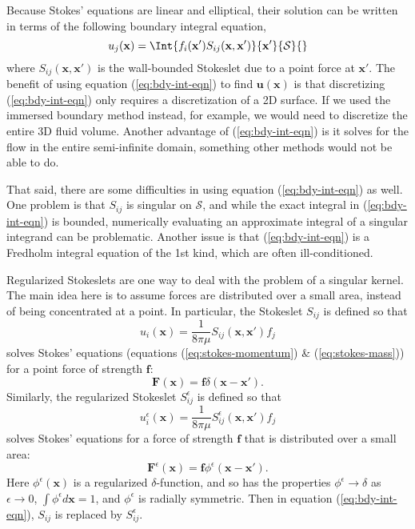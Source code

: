 Because Stokes' equations are linear and elliptical, their solution
can be written in terms of the following boundary integral equation,
\begin{equation}
  \label{eq:bdy-int-eqn}
  u_j(\mathbf{x}) = \Int{f_i(\mathbf{x}') S_{ij}(\mathbf{x},
    \mathbf{x}')}{\mathbf{x}'}{\mathcal{S}}{}
\end{equation}
where $S_{ij}(\mathbf{x}, \mathbf{x}')$ is the wall-bounded Stokeslet
due to a point force at $\mathbf{x}'$. The benefit of using equation
(\ref{eq:bdy-int-eqn}) to find $\mathbf{u}(\mathbf{x})$ is that
discretizing (\ref{eq:bdy-int-eqn}) only requires a discretization of
a 2D surface. If we used the immersed boundary method instead, for
example, we would need to discretize the entire 3D fluid
volume. Another advantage of (\ref{eq:bdy-int-eqn}) is it solves for
the flow in the entire semi-infinite domain, something other methods
would not be able to do.

That said, there are some difficulties in using equation
(\ref{eq:bdy-int-eqn}) as well. One problem is that $S_{ij}$ is
singular on $\mathcal{S}$, and while the exact integral in
(\ref{eq:bdy-int-eqn}) is bounded, numerically evaluating an
approximate integral of a singular integrand can be
problematic. Another issue is that (\ref{eq:bdy-int-eqn}) is a
Fredholm integral equation of the 1st kind, which are often
ill-conditioned.

Regularized Stokeslets \cite{Cortez2001} are one way to deal with the
problem of a singular kernel. The main idea here is to assume forces
are distributed over a small area, instead of being concentrated at a
point. In particular, the Stokeslet $S_{ij}$ is defined so that
\begin{equation}
  \label{eq:flow-pt-force}
  u_i(\mathbf{x}) = \frac{1}{8 \pi \mu}
  S_{ij}(\mathbf{x}, \mathbf{x}') f_j
\end{equation}
solves Stokes' equations (equations (\ref{eq:stokes-momentum}) \&
(\ref{eq:stokes-mass})) for a point force of strength $\mathbf{f}$:
\begin{equation}
  \mathbf{F}(\mathbf{x}) = \mathbf{f} \delta(\mathbf{x} - \mathbf{x}').
\end{equation}
Similarly, the regularized Stokeslet $S_{ij}^\epsilon$ is defined so
that
\begin{equation}
  \label{eq:flow-blob-force}
  u_i^\epsilon(\mathbf{x}) = \frac{1}{8 \pi \mu} S_{ij}^\epsilon(\mathbf{x},
  \mathbf{x}') f_j
\end{equation}
solves Stokes' equations for a force of strength $\mathbf{f}$ that is
distributed over a small area:
\begin{equation}
  \mathbf{F}^\epsilon(\mathbf{x}) = \mathbf{f}
  \phi^\epsilon(\mathbf{x} - \mathbf{x}').  
\end{equation}
Here $\phi^\epsilon(\mathbf{x})$ is a regularized $\delta$-function,
and so has the properties $\phi^\epsilon \rightarrow \delta$ as
$\epsilon \rightarrow 0$, $\int \phi^\epsilon d\mathbf{x} = 1$, and
$\phi^\epsilon$ is radially symmetric. Then in equation
(\ref{eq:bdy-int-eqn}), $S_{ij}$ is replaced by $S_{ij}^\epsilon$.

